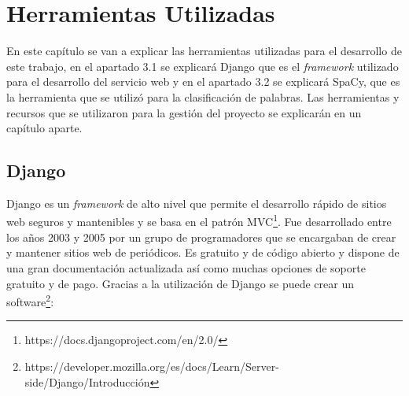\chapter{Herramientas Utilizadas}
\label{cap:herramientas}

En este capítulo se van a explicar las herramientas utilizadas para el desarrollo de este trabajo, en el apartado 3.1 se explicará Django que es el \textit{framework} utilizado para el desarrollo del servicio web y en el apartado 3.2 se explicará SpaCy, que es la herramienta que se utilizó para la clasificación de palabras. Las herramientas y recursos que se utilizaron para la gestión del proyecto se explicarán en un capítulo aparte.


\section{Django}
\label{cap:sec:django}
Django es un \textit{framework} de alto nivel que permite el desarrollo rápido de sitios web seguros y mantenibles y se basa en el patrón MVC\footnote{https://docs.djangoproject.com/en/2.0/}. Fue desarrollado entre los años 2003 y 2005 por un grupo de programadores que se encargaban de crear y mantener sitios web de periódicos. 
Es gratuito y de código abierto y dispone de una gran documentación actualizada así como muchas opciones de soporte gratuito y de pago. Gracias a la utilización de Django se puede crear un software\footnote{https://developer.mozilla.org/es/docs/Learn/Server-side/Django/Introducción}:
